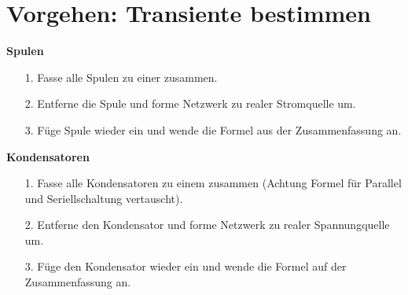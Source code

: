 \section{Vorgehen: Transiente bestimmen}

\textbf{Spulen}
\begin{itemize}
\item[1.] Fasse alle Spulen zu einer zusammen.
\item[2.] Entferne die Spule und forme Netzwerk zu realer Stromquelle um.
\item[3.] Füge Spule wieder ein und wende die Formel aus der Zusammenfassung an.
\end{itemize}

\textbf{Kondensatoren}
\begin{itemize}
\item[1.] Fasse alle Kondensatoren zu einem zusammen (Achtung Formel für Parallel und Seriellschaltung vertauscht).
\item[2.] Entferne den Kondensator und forme Netzwerk zu realer Spannungquelle um.
\item[3.] Füge den Kondensator wieder ein und wende die Formel auf der Zusammenfassung an.
\end{itemize}

